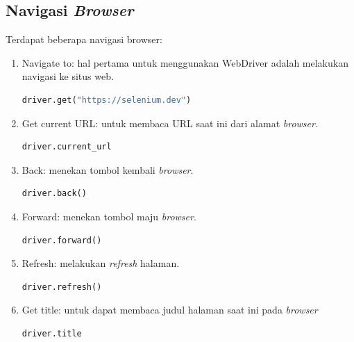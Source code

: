 \subsection{Navigasi \textit{Browser}}
Terdapat beberapa navigasi browser:
\begin{enumerate}
	\item Navigate to: hal pertama untuk menggunakan WebDriver adalah melakukan navigasi ke situs web.
	\begin{lstlisting}[language=python, caption=Contoh kode Navigate to, label=kode:2:navigate]
		driver.get("https://selenium.dev")
	\end{lstlisting}
	\item Get current URL: untuk membaca URL saat ini dari alamat \textit{browser}.
	\begin{lstlisting}[language=python, caption=Contoh kode Get current URL, label=kode:2:current]
		driver.current_url
	\end{lstlisting}
	\item Back: menekan tombol kembali \textit{browser}.
	\begin{lstlisting}[language=python, caption=Contoh kode Back, label=kode:2:back]
		driver.back()
	\end{lstlisting}
	\item Forward: menekan tombol maju \textit{browser}.
	\begin{lstlisting}[language=python, caption=Contoh kode Forward, label=kode:2:forward]
		driver.forward()
	\end{lstlisting}
	\item Refresh: melakukan \textit{refresh} halaman.
	\begin{lstlisting}[language=python, caption=Contoh kode Refresh, label=kode:2:refresh]
		driver.refresh()
	\end{lstlisting}
	\item Get title: untuk dapat membaca judul halaman saat ini pada \textit{browser}
	\begin{lstlisting}[language=python, caption=Contoh kode Get title, label=kode:2:title]
		driver.title
	\end{lstlisting}
\end{enumerate}


